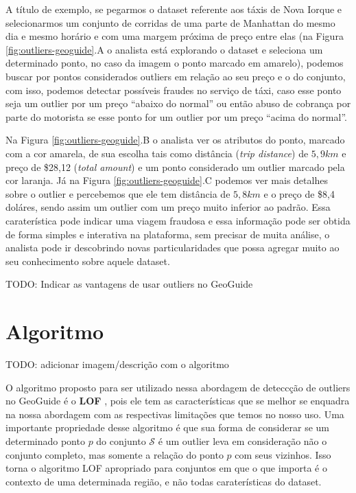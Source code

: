 A título de exemplo, se pegarmos o dataset referente aos táxis de Nova Iorque e selecionarmos um conjunto de corridas de uma parte de Manhattan do mesmo dia e mesmo horário e com uma margem próxima de preço entre elas (na Figura \ref{fig:outliers-geoguide}.A o analista está explorando o dataset e seleciona um determinado ponto, no caso da imagem o ponto marcado em amarelo), podemos buscar por pontos considerados outliers em relação ao seu preço e o do conjunto, com isso, podemos detectar possíveis fraudes no serviço de táxi, caso esse ponto seja um outlier por um preço ``abaixo do normal'' ou então abuso de cobrança por parte do motorista se esse ponto for um outlier por um preço ``acima do normal''.

Na Figura \ref{fig:outliers-geoguide}.B o analista ver os atributos do ponto, marcado com a cor amarela, de sua escolha tais como distância (\textit{trip distance}) de $5,9km$ e preço de \$28,12  (\textit{total amount}) e um ponto considerado um outlier marcado pela cor laranja. Já na Figura \ref{fig:outliers-geoguide}.C podemos ver mais detalhes sobre o outlier e percebemos que ele tem distância de $5,8km$ e o preço de \$8,4 doláres, sendo assim um outlier com um preço muito inferior ao padrão. Essa caraterística pode indicar uma viagem fraudosa e essa informação pode ser obtida de forma simples e interativa na plataforma, sem precisar de muita análise, o analista pode ir descobrindo novas particularidades que possa agregar muito ao seu conhecimento sobre aquele dataset.

TODO: Indicar as vantagens de usar outliers no GeoGuide

\section{Algoritmo}

TODO: adicionar imagem/descrição com o algoritmo

O algoritmo proposto para ser utilizado nessa abordagem de deteccção de outliers no GeoGuide \cite{omidvarTehrani2017} é o \textbf{LOF} \cite{Breunig:2000:LID:335191.335388}, pois ele tem as características que se melhor se enquadra na nossa abordagem com as respectivas limitações que temos no nosso uso. Uma importante propriedade desse algoritmo é que sua forma de considerar se um determinado ponto $p$ do conjunto $\mathcal{S}$ é um outlier leva em consideração não o conjunto completo, mas somente a relação do ponto $p$ com seus vizinhos. Isso torna o algoritmo LOF apropriado para conjuntos em que o que importa é o contexto de uma determinada região, e não todas caraterísticas do dataset.

